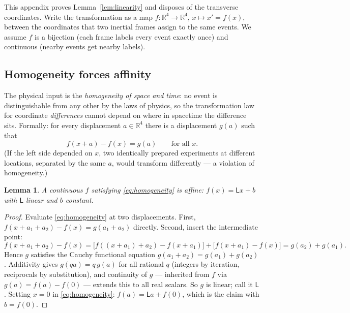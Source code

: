 \documentclass[11pt]{article}
\theoremstyle{plain}
\newtheorem{lemma}[theorem]{Lemma}
\theoremstyle{definition}
\theoremstyle{remark}
\newcommand{\R}{\mathbb{R}}
\begin{document}
This appendix proves Lemma~\ref{lem:linearity} and disposes of the
transverse coordinates. Write the transformation as a map
$f: \R^4 \to \R^4$, $x \mapsto x' = f(x)$, between the coordinates that
two inertial frames assign to the same events. We assume $f$ is a
bijection (each frame labels every event exactly once) and continuous
(nearby events get nearby labels).

\subsection{Homogeneity forces affinity}

The physical input is the \emph{homogeneity of space and time}: no event
is distinguishable from any other by the laws of physics, so the
transformation law for coordinate \emph{differences} cannot depend on
where in spacetime the difference sits. Formally: for every displacement
$a \in \R^4$ there is a displacement $g(a)$ such that
\begin{equation}
  f(x + a) - f(x) = g(a)
  \qquad\text{for all } x .
  \label{eq:homogeneity}
\end{equation}
(If the left side depended on $x$, two identically prepared experiments
at different locations, separated by the same $a$, would transform
differently --- a violation of homogeneity.)

\begin{lemma}\label{lem:cauchy}
A continuous $f$ satisfying \eqref{eq:homogeneity} is affine:
$f(x) = \mathsf{L}x + b$ with $\mathsf{L}$ linear and $b$ constant.
\end{lemma}

\begin{proof}
Evaluate \eqref{eq:homogeneity} at two displacements. First,
$f(x + a_1 + a_2) - f(x) = g(a_1 + a_2)$ directly. Second, insert the
intermediate point:
\begin{equation}
  f(x + a_1 + a_2) - f(x)
  = \bigl[f((x + a_1) + a_2) - f(x + a_1)\bigr]
  + \bigl[f(x + a_1) - f(x)\bigr]
  = g(a_2) + g(a_1).
\end{equation}
Hence $g$ satisfies the Cauchy functional equation
$g(a_1 + a_2) = g(a_1) + g(a_2)$. Additivity gives $g(qa) = q\,g(a)$ for
all rational $q$ (integers by iteration, reciprocals by substitution),
and continuity of $g$ --- inherited from $f$ via
$g(a) = f(a) - f(0)$ --- extends this to all real scalars. So $g$ is
linear; call it $\mathsf{L}$. Setting $x = 0$ in \eqref{eq:homogeneity}:
$f(a) = \mathsf{L}a + f(0)$, which is the claim with $b = f(0)$.
\end{proof}
\end{document}
